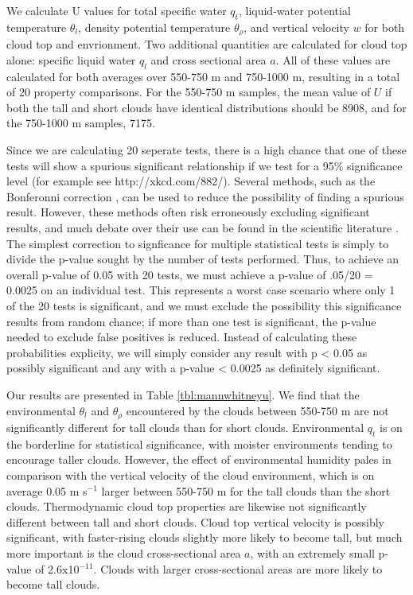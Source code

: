 \documentclass[acp]{copernicus}
\begin{document}
We calculate U values for total specific water $q_t$, liquid-water potential 
temperature $\theta_l$, density potential temperature $\theta_\rho$, and 
vertical velocity $w$ for both cloud top and envrionment.  Two additional 
quantities are calculated for cloud top alone: specific liquid water $q_l$ and 
cross sectional area $a$.  All of these values are calculated for both averages 
over 550-750 m and 750-1000 m, resulting in a total of 20 property comparisons.
For the 550-750 m samples, the mean value of $U$ if both the tall and short 
clouds have identical distributions should be 8908, and for the 750-1000 m 
samples, 7175.  

Since we are calculating 20 seperate tests, there is a high chance that one of 
these tests will show a spurious significant relationship if we test for a 95\% 
significance level (for example see http://xkcd.com/882/).  Several methods, 
such as the Bonferonni correction \citep{Shaffer1995}, can be used to reduce 
the possibility of finding a spurious result.  However, these methods often 
risk erroneously excluding significant results, and much debate over their use 
can be found in the scientific literature \citep{Perneger1998, Nakagawa2004}.  
The simplest correction to signficance for multiple statistical tests is simply 
to divide the p-value sought by the number of tests performed.  Thus, to 
achieve an overall p-value of 0.05 with 20 tests, we must achieve a p-value of 
.05/20 = 0.0025 on an individual test. This represents a worst case scenario 
where only 1 of the 20 tests is significant, and we must exclude the 
possibility this significance results from random chance; if more than one test 
is significant, the p-value needed to exclude false positives is reduced.  
Instead of calculating these probabilities explicity, we will simply consider 
any result with p < 0.05 as possibly significant and any with a 
p-value < 0.0025 as definitely significant.  

Our results are presented in Table \ref{tbl:mannwhitneyu}.  We find that the 
environmental $\theta_l$ and $\theta_\rho$ encountered by the clouds between 
550-750 m are not significantly different for tall clouds than for short 
clouds.  Environmental $q_t$ is on the borderline for statistical significance, 
with moister environments tending to encourage taller clouds.  However, the 
effect of environmental humidity pales in comparison with the vertical velocity 
of the cloud environment, which is on average 0.05 m s$^{-1}$ larger between 
550-750 m for the tall clouds than the short clouds.  Thermodynamic cloud top 
properties are likewise not significantly different between tall and short 
clouds.  Cloud top vertical velocity is possibly significant, with 
faster-rising clouds slightly more likely to become tall, but much more 
important is the cloud cross-sectional area $a$, with an extremely small 
p-value of 2.6x10$^{-11}$.  Clouds with larger cross-sectional areas are more 
likely to become tall clouds.
\end{document}
